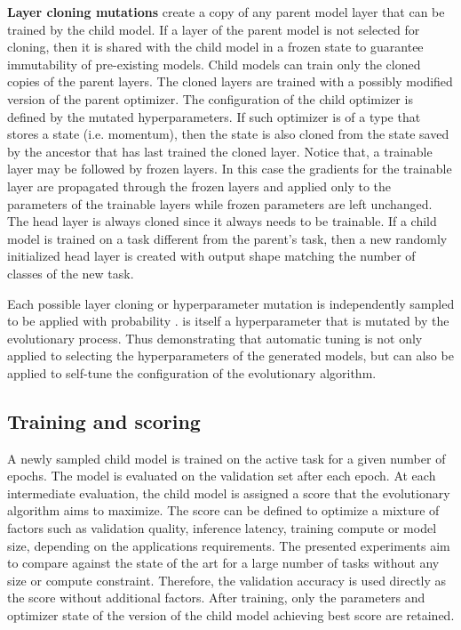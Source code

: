 \documentclass{article} \usepackage{iclr2023_conference,times}
\begin{document}
\textbf{Layer cloning mutations} create a copy of any parent model layer that can be trained by the child model.
If a layer of the parent model is not selected for cloning,
then it is shared with the child model in a frozen state to guarantee immutability of pre-existing models. Child models can train only the cloned copies of the parent layers.
The cloned layers are trained with a possibly modified version of the parent optimizer.
The configuration of the child optimizer is defined by the mutated hyperparameters.
If such optimizer is of a type that stores a state 
(i.e. momentum),
then the state is also cloned from the state saved by the ancestor that has last trained the cloned layer.
Notice that,
a trainable layer may be followed by frozen layers.
In this case the gradients for the trainable layer are propagated through the frozen layers and applied only to the parameters of the trainable layers while frozen parameters are left unchanged.
The head layer is always cloned since it always needs to be trainable.
If a child model is trained on a task different from the parent's task, then a new randomly initialized head layer is created with output shape matching the number of classes of the new task.

Each possible layer cloning or hyperparameter mutation is independently sampled to be applied with probability .
 is itself a hyperparameter that is mutated by the evolutionary process.
Thus demonstrating that automatic tuning is not only applied to selecting the hyperparameters of the generated models, but can also be applied to self-tune the configuration of the evolutionary algorithm.

\subsection{Training and scoring}
\label{subsection:scoring}
A newly sampled child model is trained on the active task for a given number of epochs.
The model is evaluated on the validation set after each epoch.
At each intermediate evaluation, the child model is assigned a score that the evolutionary algorithm aims to maximize.
The score can be defined to optimize a mixture of factors such as validation quality, inference latency, training compute or model size, depending on the applications requirements.
The presented experiments aim to compare against the state of the art for a large number of tasks without any size or compute constraint.
Therefore, the validation accuracy is used directly as the score without additional factors.
After training, only the parameters and optimizer state of the version of the child model achieving best score are retained.
\end{document}
